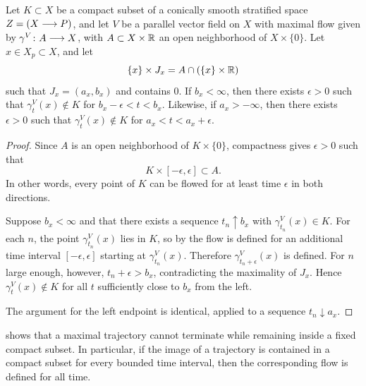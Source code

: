 \begin{lemma}\label{lem:compact flows}
    Let $K\subset X$ be a compact subset of a conically smooth stratified space $Z =(X\longrightarrow P)$, and let $V$ be a parallel vector field on $X$ with maximal flow given by $\gamma^V \colon A \longrightarrow X$, with $A\subset X\times \mathbb R$ an open neighborhood of $X\times \{0\}$. Let $x\in X_p \subset X$, and let 
    \begin{equation}\label{eq:lem:compact flows}
        \{x\}\times J_x  = A \cap (\{x\}\times \mathbb R)
    \end{equation}
    such that $J_x = (a_x,b_x)$ and contains $0$. If $b_x<\infty$, then there exists $\epsilon > 0$ such that $\gamma^V_t(x)\notin K$ for $b_x - \epsilon < t < b_x$. Likewise, if $a_x>-\infty$, then there exists $\epsilon > 0$ such that $\gamma^V_t(x)\notin K$ for $a_x < t < a_x+\epsilon$.
\end{lemma}
\begin{proof}
    Since $A$ is an open neighborhood of $K\times \{0\}$, compactness gives $\epsilon>0$ such that
    \begin{equation}\label{eq:lem:prf:compact flows cover}
        K\times [-\epsilon,\epsilon] \subset A.
    \end{equation}
    In other words, every point of $K$ can be flowed for at least time $\epsilon$ in both directions.

    Suppose $b_x<\infty$ and that there exists a sequence $t_n \uparrow b_x$ with $\gamma^V_{t_n}(x)\in K$. For each $n$, the point $\gamma^V_{t_n}(x)$ lies in $K$, so by  the flow is defined for an additional time interval $[-\epsilon,\epsilon]$ starting at $\gamma^V_{t_n}(x)$. Therefore $\gamma^V_{t_n+\epsilon}(x)$ is defined. For $n$ large enough, however, $t_n+\epsilon>b_x$, contradicting the maximality of $J_x$. Hence $\gamma^V_t(x)\notin K$ for all $t$ sufficiently close to $b_x$ from the left.

    The argument for the left endpoint is identical, applied to a sequence $t_n \downarrow a_x$.
\end{proof}


\begin{remark}\label{rmk:flow out of compact}
 shows that a maximal trajectory cannot terminate while remaining inside a fixed compact subset. In particular, if the image of a trajectory is contained in a compact subset for every bounded time interval, then the corresponding flow is defined for all time.
\end{remark}


